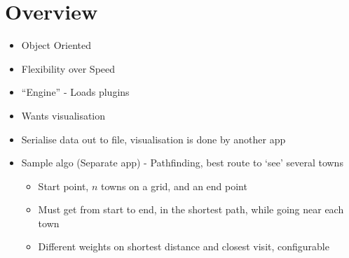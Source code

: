 
\date{8th August, 2011}
\apologies{}
\absent{-}


\maketitle

\section{Overview}
\begin{itemize}
\item{Object Oriented}
\item{Flexibility over Speed}
\item{``Engine'' - Loads plugins}
\item{Wants visualisation}
\item{Serialise data out to file, visualisation is done by another app}
\item{Sample algo (Separate app) - Pathfinding, best route to `see' several towns}
 \begin{itemize}
 \item{Start point, $n$ towns on a grid, and an end point}
 \item{Must get from start to end, in the shortest path, while going near each town}
 \item{Different weights on shortest distance and closest visit, configurable}
 \end{itemize}
\end{itemize}


